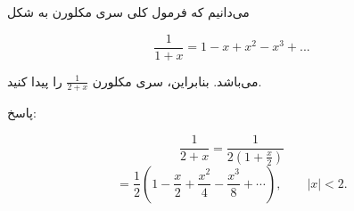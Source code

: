 می‌دانیم که فرمول کلی سری مکلورن به شکل 

$$\frac{1}{1 + x} = 1  - x + x^{2} - x^{3} + ...$$

می‌باشد. بنابراین، سری مکلورن $\frac{1}{2 + x}$ را پیدا کنید.

پاسخ:


    $$\frac{1}{2 + x} = \frac{1}{2 (1 + \frac{x}{2})}$$
    $$= \frac{1}{2} \left(1 - \frac{x}{2} + \frac{x^{2}}{4} - \frac{x^{3}}{8} + \cdots\right), \qquad |x|<2.$$



